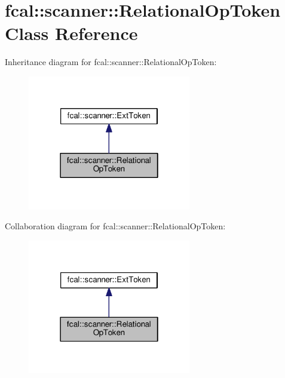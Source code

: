 \hypertarget{classfcal_1_1scanner_1_1RelationalOpToken}{}\section{fcal\+:\+:scanner\+:\+:Relational\+Op\+Token Class Reference}
\label{classfcal_1_1scanner_1_1RelationalOpToken}


Inheritance diagram for fcal\+:\+:scanner\+:\+:Relational\+Op\+Token\+:
\nopagebreak
\begin{figure}[H]
\begin{center}
\leavevmode
\includegraphics[width=202pt]{classfcal_1_1scanner_1_1RelationalOpToken__inherit__graph}
\end{center}
\end{figure}


Collaboration diagram for fcal\+:\+:scanner\+:\+:Relational\+Op\+Token\+:
\nopagebreak
\begin{figure}[H]
\begin{center}
\leavevmode
\includegraphics[width=202pt]{classfcal_1_1scanner_1_1RelationalOpToken__coll__graph}
\end{center}
\end{figure}
